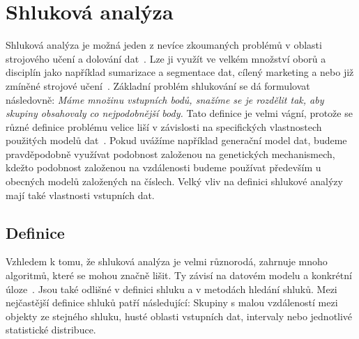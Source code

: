 \chapter{Shluková analýza} \label{sec:clusteranalysis}
Shluková analýza je možná jeden z nevíce zkoumaných problémů v oblasti strojového učení a dolování dat~\cite{Aggarwal13}. Lze ji využít ve velkém množství oborů a disciplín jako například sumarizace a segmentace dat, cílený marketing a nebo již zmíněné strojové učení~\cite{Jain10, Kaufman90}. Základní problém shlukování se dá formulovat následovně: \textit{Máme množinu vstupních bodů, snažíme se je rozdělit tak, aby skupiny obsahovaly co nejpodobnější body.} Tato definice je velmi vágní, protože se různé definice problému velice liší v závislosti na specifických vlastnostech použitých modelů dat~\cite{Aggarwal13}. Pokud uvážíme například generační model dat, budeme pravděpodobně využívat podobnost založenou na genetických mechanismech, kdežto podobnost založenou na vzdálenosti budeme používat především u obecných modelů založených na číslech. Velký vliv na definici shlukové analýzy mají také vlastnosti vstupních dat.

\section{Definice}
Vzhledem k tomu, že shluková analýza je velmi různorodá, zahrnuje mnoho algoritmů, které se mohou značně lišit. Ty závisí na datovém modelu a konkrétní úloze~\cite{Aggarwal13}. Jsou také odlišné v definici shluku a v metodách hledání shluků. Mezi nejčastější definice shluků patří následující: Skupiny s malou vzdá\-le\-nos\-tí mezi objekty ze stejného shluku, husté oblasti vstupních dat, intervaly nebo jednotlivé statistické distribuce.\\


